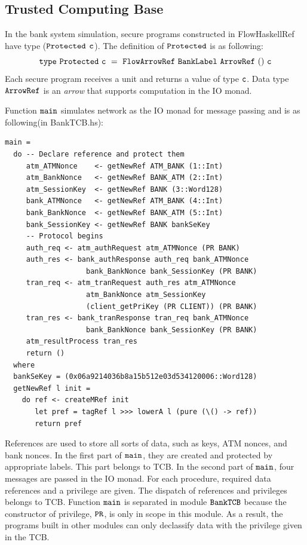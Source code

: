 \documentclass{report}
\newcommand{\co}[1]{$\cod{#1}$}
\begin{document}
\subsection{Trusted Computing Base}
\label{chap6:banksystem:tcb}
In the bank system simulation, secure programs constructed in FlowHaskellRef have type (\co{Protected} \co{c}).
The definition of \co{Protected} is as following:
\[
\mathtt{type}~\mathtt{Protected}~\mathtt{c}~=~\mathtt{FlowArrowRef}~\mathtt{BankLabel}~\mathtt{ArrowRef}~()~\mathtt{c}
\]
Each secure program receives a unit and returns a value of type \co{c}. Data type \co{ArrowRef} is an {\em arrow}
that supports computation in the IO monad.

Function \co{main} simulates network as the IO monad for message passing and is as following(in BankTCB.hs):
\begin{Verbatim}[fontsize=\small]
main =
  do -- Declare reference and protect them
     atm_ATMNonce    <- getNewRef ATM_BANK (1::Int)
     atm_BankNonce   <- getNewRef BANK_ATM (2::Int)
     atm_SessionKey  <- getNewRef BANK (3::Word128)
     bank_ATMNonce   <- getNewRef ATM_BANK (4::Int)
     bank_BankNonce  <- getNewRef BANK_ATM (5::Int)
     bank_SessionKey <- getNewRef BANK bankSeKey     
     -- Protocol begins
     auth_req <- atm_authRequest atm_ATMNonce (PR BANK)
     auth_res <- bank_authResponse auth_req bank_ATMNonce 
                   bank_BankNonce bank_SessionKey (PR BANK)
     tran_req <- atm_tranRequest auth_res atm_ATMNonce 
                   atm_BankNonce atm_SessionKey
                   (client_getPriKey (PR CLIENT)) (PR BANK)
     tran_res <- bank_tranResponse tran_req bank_ATMNonce 
                   bank_BankNonce bank_SessionKey (PR BANK)
     atm_resultProcess tran_res
     return ()
  where
  bankSeKey = (0x06a9214036b8a15b512e03d534120006::Word128)
  getNewRef l init =
    do ref <- createMRef init
       let pref = tagRef l >>> lowerA l (pure (\() -> ref))
       return pref
\end{Verbatim}
References are used to store all sorts of data, such as keys, ATM nonces, and bank nonces. In the first
part of \co{main}, they are created and protected by appropriate labels. This part belongs to TCB.
In the second part of \co{main},
four messages are passed in the IO monad. For each procedure, required data references and a privilege are given.
The dispatch of references and privileges belongs to TCB. Function \co{main} is separated in module \co{BankTCB}
because the constructor of privilege, \co{PR}, is only in scope in this module. 
As a result, the programs built in other modules can only declassify data with the privilege
given in the TCB.
\end{document}
